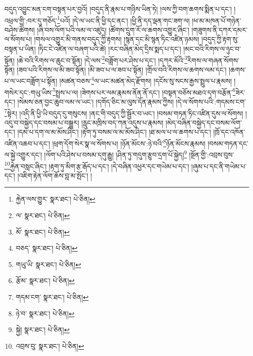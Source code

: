 བདུད་འབྱུང་མན་ངག་བསྟན་པར་བྱའོ། །བདུད་ནི་རྣམ་པ་གཉིས་ཡིན་ཏེ། །ལས་ཀྱི་བག་ཆགས་སྨིན་པ་དང་། །འཕྲལ་གྱི་:བར་དུ་གཅོད་\footnote{རྐྱེན་ལས་གྱུར་  སྣར་ཐང་།  པེ་ཅིན། }པའོ། །དེ་ལ་ཡང་ནི་ཕྱི་དང་ནང་། །ཕྱི་ནི་དད་ལྡན་གང་ཟག་ལ། །ཕ་མ་མཁན་པོ་གཉེན་བཤེས་ཚོགས། །ཞི་བས་ལོག་པའི་ལམ་ལ་འཛུད། །ཚོགས་དྲུག་རོ་ལ་ཆགས་འགྱུར་ཞིང་། །གཟུགས་ནི་དཀར་དམར་ལ་སོགས་པ། །གསལ་འགྱུར་མི་གནས་བདུད་ཀྱི་རྟགས། །སྙན་དང་མི་སྙན་ཏིང་འཛིན་ཉམས། །བདུད་ཀྱི་རྟག་སུ་བསྟན་པ་ཡིན། །ཏིང་ངེ་འཛིན་ལ་བཞག་པའི་ཚེ། །རང་བཞིན་མེད་དྲིས་སྨད་པ་དང་། །མང་བའི་རིགས་ལ་ཉུང་བ་སྟོན། །ཆེ་བའི་རིགས་ལ་ཆུང་བ་སྟོན། །དེ་ལས་\footnote{ལ་  སྣར་ཐང་།  པེ་ཅིན། }བཟློག་པར་ཤེས་པ་དང་། །དཀར་མོའི་\footnote{མོ་  སྣར་ཐང་།  པེ་ཅིན། }རིགས་ལ་གཞན་སོགས་སྟོན། །ཟབ་པའི་རིགས་ལ་མི་ཟབ་སྟོན། །མི་ཟབ་པ་ལ་ཟབ་པ་སྟོན། །གྲོལ་བའི་རིགས་ལ་ཆགས་ལམ་དང་། །ཆགས་པ་ལ་ཡང་བཟློག་པ་སྟོན། །མཚན་བཅས་\footnote{བཅད་  སྣར་ཐང་།  པེ་ཅིན། }ལ་ཡང་མཚན་མེད་རྫོགས། །དངོས་སུ་སངས་རྒྱས་སྤྲུལ་པ་རྣམས། །གསེར་དང་:གཡུ་ཡིས་\footnote{གཡུ་ཡི་  སྣར་ཐང་།  པེ་ཅིན། }སྤྲས་པ་ལ། །ཟེགས་པར་ལམ་རྣམས་ནོན་ནོ་དང་། །བསྟན་བཅོས་མཐའ་དག་བརྩོན་\footnote{རྩོམ་  སྣར་ཐང་།  པེ་ཅིན། }ཟེར་དང་། །སེམས་ཅན་བྱང་ཆུབ་ལམ་ལ་ཡང་། །དགོད་ཅིང་མ་ལུས་དོན་རྣམས་ཀྱིས། །དེ་ལ་སོགས་པའི་:གདམས་ངག་\footnote{གདམ་ངག་  སྣར་ཐང་།  པེ་ཅིན། }སྟེར། །འདི་ནི་ཕྱི་ཡི་བདུད་དུ་གསུངས། །ནང་གི་བདུད་ཀྱི་སྦྱོར་བ་ཡང་། །བསམ་གཏན་ཏིང་འཛིན་དུས་ལ་སོགས། །འདུ་བ་བསྐྱེད་དང་བསམ་པ་བསྒྱུར། །རླུང་མཁྲིས་བད་ཀན་འདུས་པ་རྣམས། །མེད་བཞིན་བསྐྱེད་དང་བསམ་ལོག་དང་། །དམ་པ་དག་ལ་མ་མོས་ཤིང་། །རྟག་ཏུ་བསམ་ལ་མ་མོས་ཤིང་། །ཐ་མལ་པ་ལ་ཆགས་པ་དང་། །ཁྲོ་དང་འཁོན་འཛིན་འཆབ་པ་དང་། །ཕྲག་དོག་སེར་སྣ་ལ་སོགས་པ། །ཉོན་མོངས་:ཉེ་བའི་\footnote{ཉེ་བ་  སྣར་ཐང་།  པེ་ཅིན། }ཉོན་མོངས་རྣམས། །བསམ་གཏན་དང་ལ་སྐྱེ་འགྱུར་དང་། །ལོག་པའི་ཤེས་པ་བསམ་དགུ་རྒྱུ། །ཤིན་ཏུ་གདུག་རྩུབ་དྲག་པོ་སྐྱེད།\footnote{སྐྱེ།  སྣར་ཐང་།  པེ་ཅིན། } །སྔོན་གྱི་:འབྲས་བུས་\footnote{འབྲས་བུ་  སྣར་ཐང་།  པེ་ཅིན། }རྐྱེན་བསླང་ཞིང་། །རྟག་ཏུ་མིག་རྩ་རྒོད་པ་དང་། །དེ་བཞིན་འཕྱར་དང་གཡེམ་པ་དང་། །ཞུམ་པ་དང་ནི་གཡེམ་པ་དང་། །འཇིག་རྟེན་ལོག་ཆོས་བླ་མ་སྤོང་། །
